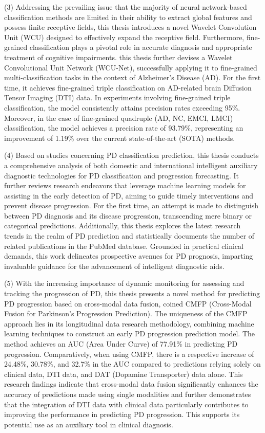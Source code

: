 \begin{englishabstract}
(3) Addressing the prevailing issue that the majority of neural network-based classification methods are limited in their ability to extract global features and possess finite receptive fields, this thesis introduces a novel Wavelet Convolution Unit (WCU) designed to effectively expand the receptive field. Furthermore, fine-grained classification plays a pivotal role in accurate diagnosis and appropriate treatment of cognitive impairments. this thesis further devises a Wavelet Convolutional Unit Network (WCU-Net), successfully applying it to fine-grained multi-classification tasks in the context of Alzheimer's Disease (AD). For the first time, it achieves fine-grained triple classification on AD-related brain Diffusion Tensor Imaging (DTI) data. In experiments involving fine-grained triple classification, the model consistently attains precision rates exceeding 95\%.
Moreover, in the case of fine-grained quadruple (AD, NC, EMCI, LMCI) classification, the model achieves a precision rate of 93.79\%, representing an improvement of 1.19\% over the current state-of-the-art (SOTA) methods.

(4) Based on studies concerning PD classification prediction, this thesis conducts a comprehensive analysis of both domestic and international intelligent auxiliary diagnostic technologies for PD classification and progression forecasting. It further reviews research endeavors that leverage machine learning models for assisting in the early detection of PD, aiming to guide timely interventions and prevent disease progression. For the first time, an attempt is made to distinguish between PD diagnosis and its disease progression, transcending mere binary or categorical predictions.
Additionally, this thesis explores the latest research trends in the realm of PD prediction and statistically documents the number of related publications in the PubMed database. Grounded in practical clinical demands, this work delineates prospective avenues for PD prognosis, imparting invaluable guidance for the advancement of intelligent diagnostic aids.

(5) With the increasing importance of dynamic monitoring for assessing and tracking the progression of PD, this thesis presents a novel method for predicting PD progression based on cross-modal data fusion, coined CMFP (Cross-Modal Fusion for Parkinson’s Progression Prediction). The uniqueness of the CMFP approach lies in its longitudinal data research methodology, combining machine learning techniques to construct an early PD progression prediction model. The method achieves an AUC (Area Under Curve) of 77.91\% in predicting PD progression.
Comparatively, when using CMFP, there is a respective increase of 24.48\%, 30.78\%, and 32.7\% in the AUC compared to predictions relying solely on clinical data, DTI data, and DAT (Dopamine Transporter) data alone. This research findings indicate that cross-modal data fusion significantly enhances the accuracy of predictions made using single modalities and further demonstrates that the integration of DTI data with clinical data particularly contributes to improving the performance in predicting PD progression. This supports its potential use as an auxiliary tool in clinical diagnosis.



\end{englishabstract}
